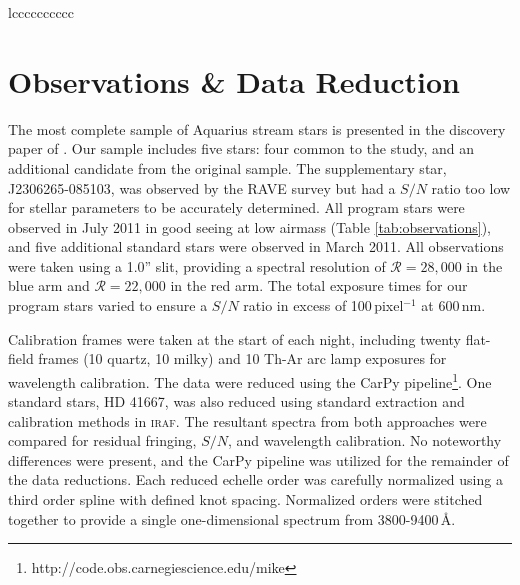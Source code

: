 \documentclass{emulateapj}
\begin{document}
\begin{deluxetable*}{lcccccccccc}




\enddata
{}
\end{deluxetable*}


\section{Observations \& Data Reduction}

The most complete sample of Aquarius stream stars is presented in the discovery paper of \citet{williams;et-al_2011}. Our sample includes five stars: four common to the \citet{wylie-de-boer;et-al_2012} study, and an additional candidate from the original \citet{williams;et-al_2011} sample. The supplementary star, J2306265-085103, was observed by the RAVE survey but had a $S/N$ ratio too low for stellar parameters to be accurately determined. All program stars were observed in July 2011 in good seeing at low airmass (Table \ref{tab:observations}), and five additional standard stars were observed in March 2011. All observations were taken using a 1.0'' slit, providing a spectral resolution of $\mathcal{R} = 28,000$ in the blue arm and $\mathcal{R} = 22,000$ in the red arm. The total exposure times for our program stars varied to ensure a $S/N$ ratio in excess of 100\,pixel$^{-1}$ at 600\,nm.

Calibration frames were taken at the start of each night, including twenty flat-field frames (10 quartz, 10 milky) and 10 Th-Ar arc lamp exposures for wavelength calibration. The data were reduced using the CarPy pipeline\footnote{http://code.obs.carnegiescience.edu/mike}. One standard stars, HD 41667, was also reduced using standard extraction and calibration methods in \textsc{iraf}. The resultant spectra from both approaches were compared for residual fringing, $S/N$, and wavelength calibration. No noteworthy differences were present, and the CarPy pipeline was utilized for the remainder of the data reductions. Each reduced echelle order was carefully normalized using a third order spline with defined knot spacing. Normalized orders were stitched together to provide a single one-dimensional spectrum from 3800-9400\,\AA{}. 
 
\end{document}
